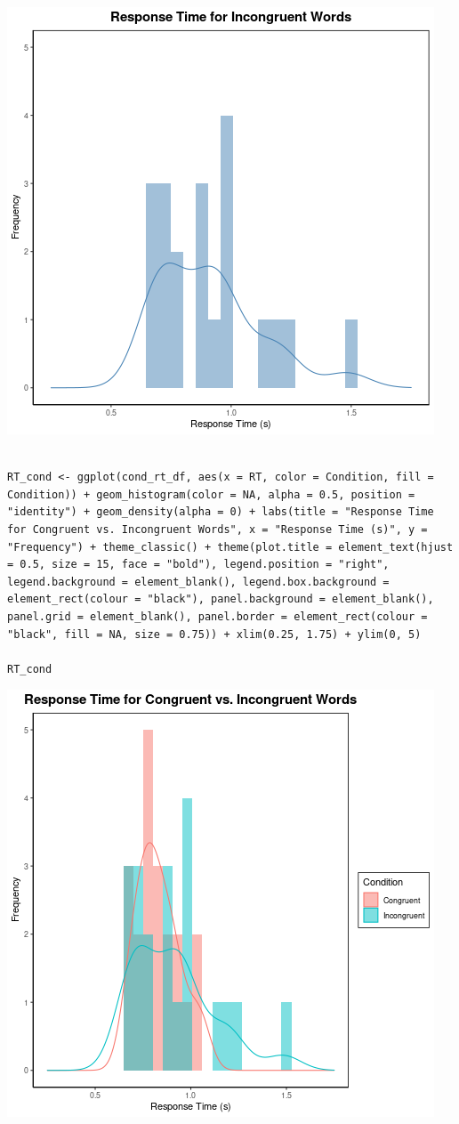\documentclass{article}
\begin{document}
\begin{center}
\includegraphics[width=.9\linewidth]{converted_stroop6.png}
\end{center}



\begin{verbatim}

RT_cond <- ggplot(cond_rt_df, aes(x = RT, color = Condition, fill = Condition)) + geom_histogram(color = NA, alpha = 0.5, position = "identity") + geom_density(alpha = 0) + labs(title = "Response Time for Congruent vs. Incongruent Words", x = "Response Time (s)", y = "Frequency") + theme_classic() + theme(plot.title = element_text(hjust = 0.5, size = 15, face = "bold"), legend.position = "right", legend.background = element_blank(), legend.box.background = element_rect(colour = "black"), panel.background = element_blank(), panel.grid = element_blank(), panel.border = element_rect(colour = "black", fill = NA, size = 0.75)) + xlim(0.25, 1.75) + ylim(0, 5)

RT_cond

\end{verbatim}

\begin{center}
\includegraphics[width=.9\linewidth]{converted_stroop7.png}
\end{center}
\end{document}
